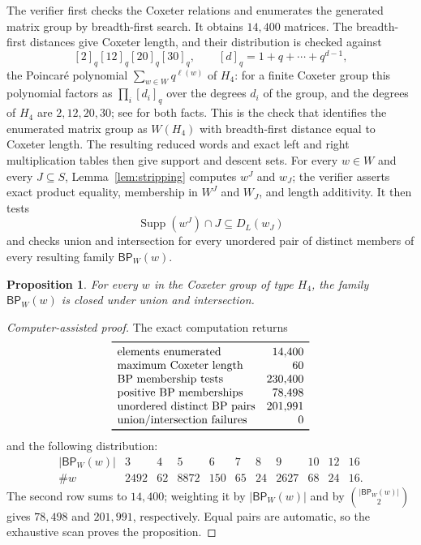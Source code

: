 \documentclass[11pt]{amsart}
\newtheorem{proposition}[theorem]{Proposition}
\DeclareMathOperator{\Supp}{Supp}
\newcommand{\BP}{\mathsf{BP}}
\newcommand{\DL}{D_L}
\begin{document}
The verifier first checks the Coxeter relations and enumerates the generated
matrix group by breadth-first search. It obtains $14{,}400$ matrices. The
breadth-first distances give Coxeter length, and their distribution is
checked against
\[
  [2]_q[12]_q[20]_q[30]_q,
  \qquad
  [d]_q=1+q+\cdots+q^{d-1},
\]
the Poincar\'e polynomial $\sum_{w\in W}q^{\ell(w)}$ of $H_4$: for a finite
Coxeter group this polynomial factors as $\prod_i[d_i]_q$ over the degrees
$d_i$ of the group, and the degrees of $H_4$ are $2,12,20,30$; see
\cite{Humphreys} for both facts. This is the check that identifies the
enumerated matrix group as $W(H_4)$ with breadth-first distance equal to
Coxeter length. The resulting reduced words and exact
left and right multiplication tables then give support and descent sets.
For every $w\in W$ and every $J\subseteq S$,
Lemma~\ref{lem:stripping} computes $w^J$ and $w_J$; the verifier asserts
exact product equality, membership in $W^J$ and $W_J$, and length
additivity. It then tests
\[
  \Supp(w^J)\cap J\subseteq\DL(w_J)
\]
and checks union and intersection for every unordered pair of distinct
members of every resulting family $\BP_W(w)$.

\begin{proposition}\label{prop:h4}
For every $w$ in the Coxeter group of type $H_4$, the family $\BP_W(w)$ is
closed under union and intersection.
\end{proposition}

\begin{proof}[Computer-assisted proof]
The exact computation returns
\[
\begin{array}{lr}
\toprule
\text{elements enumerated} & 14{,}400\\
\text{maximum Coxeter length} & 60\\
\text{BP membership tests} & 230{,}400\\
\text{positive BP memberships} & 78{,}498\\
\text{unordered distinct BP pairs} & 201{,}991\\
\text{union/intersection failures} & 0\\
\bottomrule
\end{array}
\]
and the following distribution:
\[
\begin{array}{c|rrrrrrrrrr}
|\BP_W(w)|
  &3&4&5&6&7&8&9&10&12&16\\ \hline
\#w
  &2492&62&8872&150&65&24&2627&68&24&16.
\end{array}
\]
The second row sums to $14{,}400$; weighting it by $|\BP_W(w)|$ and by
$\binom{|\BP_W(w)|}{2}$ gives $78{,}498$ and $201{,}991$, respectively.
Equal pairs are automatic, so the exhaustive scan proves the proposition.
\end{proof}
\end{document}
